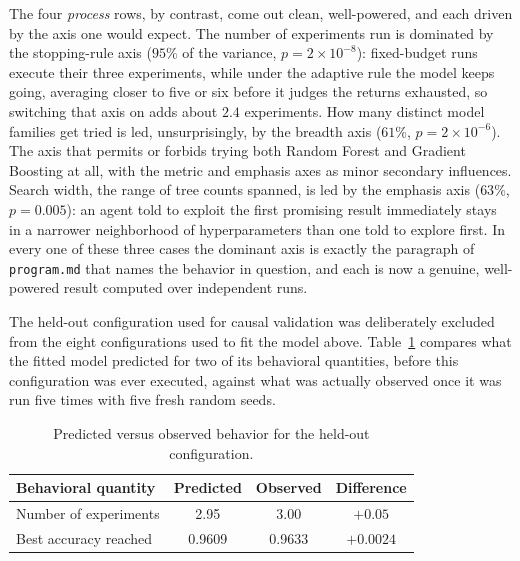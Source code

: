 \documentclass[11pt]{article}
\begin{document}
The four \emph{process} rows, by contrast, come out clean, well-powered, and each driven by the axis one would expect. The number of experiments run is dominated by the stopping-rule axis ($95\%$ of the variance, $p=2\times10^{-8}$): fixed-budget runs execute their three experiments, while under the adaptive rule the model keeps going, averaging closer to five or six before it judges the returns exhausted, so switching that axis on adds about $2.4$ experiments. How many distinct model families get tried is led, unsurprisingly, by the breadth axis ($61\%$, $p=2\times10^{-6}$). The axis that permits or forbids trying both Random Forest and Gradient Boosting at all, with the metric and emphasis axes as minor secondary influences. Search width, the range of tree counts spanned, is led by the emphasis axis ($63\%$, $p=0.005$): an agent told to exploit the first promising result immediately stays in a narrower neighborhood of hyperparameters than one told to explore first. In every one of these three cases the dominant axis is exactly the paragraph of \texttt{program.md} that names the behavior in question, and each is now a genuine, well-powered result computed over independent runs.

The held-out configuration used for causal validation was deliberately excluded from the eight configurations used to fit the model above. Table~\ref{tab:validation} compares what the fitted model predicted for two of its behavioral quantities, before this configuration was ever executed, against what was actually observed once it was run five times with five fresh random seeds.

\begin{table}[h]
\centering
\caption{Predicted versus observed behavior for the held-out configuration.}
\label{tab:validation}
\begin{tabular}{lccc}
\toprule
Behavioral quantity & Predicted & Observed & Difference \\
\midrule
Number of experiments & 2.95 & 3.00 & $+0.05$ \\
Best accuracy reached & 0.9609 & 0.9633 & $+0.0024$ \\
\bottomrule
\end{tabular}
\end{table}
\end{document}
